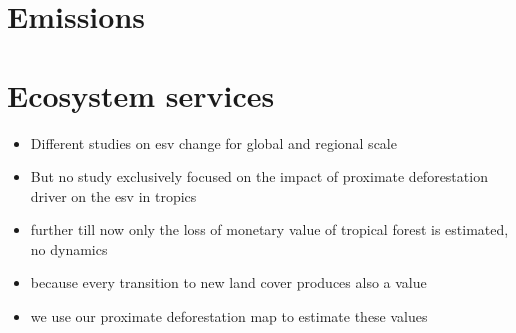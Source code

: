	\section{Emissions}
	\label{sec:deforestation}


	\section{Ecosystem services}
	\label{sec:ecosystem_services}

	\begin{itemize}
		\item Different studies on esv change for global and regional scale \citep{Song2018,Costanza2014,Sannigrahi2018}
		\item But no study exclusively focused on the impact of proximate deforestation driver on the esv in tropics
		\item further till now only the loss of monetary value of tropical forest is estimated, no dynamics
		\item because every transition to new land cover produces also a value
		\item we use our proximate deforestation map to estimate these values 
	\end{itemize}
